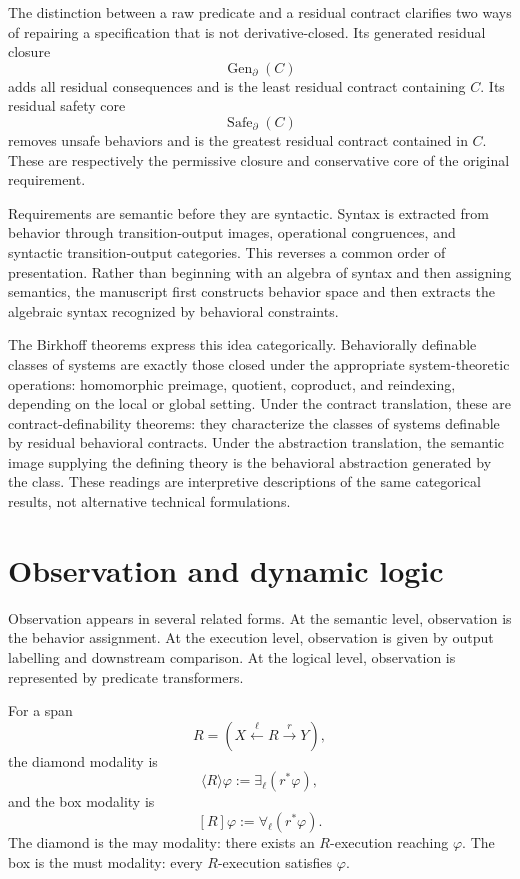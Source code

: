 The distinction between a raw predicate and a residual contract clarifies two
ways of repairing a specification that is not derivative-closed.  Its
generated residual closure
\[
  \operatorname{Gen}_{\partial}(C)
\]
adds all residual consequences and is the least residual contract containing
\(C\).  Its residual safety core
\[
  \operatorname{Safe}_{\partial}(C)
\]
removes unsafe behaviors and is the greatest residual contract contained in
\(C\).  These are respectively the permissive closure and conservative core
of the original requirement.

Requirements are semantic before they are syntactic.  Syntax is extracted
from behavior through transition-output images, operational congruences, and
syntactic transition-output categories.  This reverses a common order of
presentation.  Rather than beginning with an algebra of syntax and then
assigning semantics, the manuscript first constructs behavior space and then
extracts the algebraic syntax recognized by behavioral constraints.

The Birkhoff theorems express this idea categorically.  Behaviorally
definable classes of systems are exactly those closed under the appropriate
system-theoretic operations: homomorphic preimage, quotient, coproduct, and
reindexing, depending on the local or global setting.  Under the contract
translation, these are contract-definability theorems: they characterize the
classes of systems definable by residual behavioral contracts.  Under the
abstraction translation, the semantic image supplying the defining theory is
the behavioral abstraction generated by the class.  These readings are
interpretive descriptions of the same categorical results, not alternative
technical formulations.

\section{Observation and dynamic logic}
\label{sec:observation-and-dynamic-logic}

Observation appears in several related forms.  At the semantic level,
observation is the behavior assignment.  At the execution level, observation
is given by output labelling and downstream comparison.  At the logical level,
observation is represented by predicate transformers.

For a span
\[
  R=
  \left(
    X\xleftarrow{\ell}R\xrightarrow{r}Y
  \right),
\]
the diamond modality is
\[
  \langle R\rangle\varphi
  :=
  \exists_{\ell}(r^\ast\varphi),
\]
and the box modality is
\[
  [R]\varphi
  :=
  \forall_{\ell}(r^\ast\varphi).
\]
The diamond is the may modality: there exists an \(R\)-execution reaching
\(\varphi\).  The box is the must modality: every \(R\)-execution satisfies
\(\varphi\).

